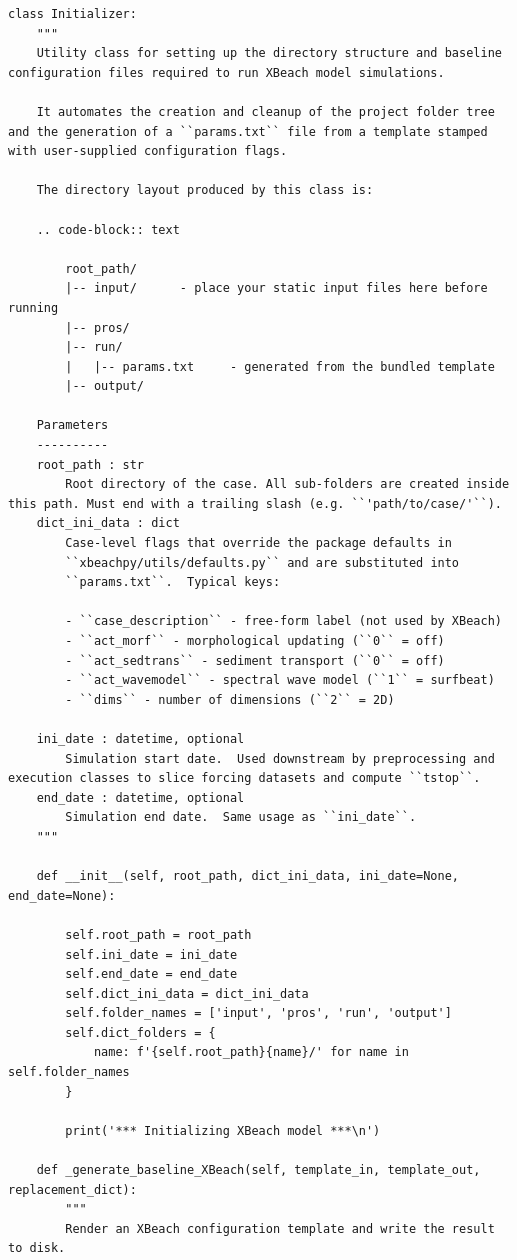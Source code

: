 \documentclass[preprint,12pt, a4paper]{elsarticle}
\begin{document}
\begin{lstlisting}
class Initializer:
    """
    Utility class for setting up the directory structure and baseline configuration files required to run XBeach model simulations.

    It automates the creation and cleanup of the project folder tree and the generation of a ``params.txt`` file from a template stamped with user-supplied configuration flags.

    The directory layout produced by this class is:

    .. code-block:: text

        root_path/
        |-- input/      - place your static input files here before running
        |-- pros/
        |-- run/
        |   |-- params.txt     - generated from the bundled template
        |-- output/

    Parameters
    ----------
    root_path : str
        Root directory of the case. All sub-folders are created inside this path. Must end with a trailing slash (e.g. ``'path/to/case/'``).
    dict_ini_data : dict
        Case-level flags that override the package defaults in
        ``xbeachpy/utils/defaults.py`` and are substituted into
        ``params.txt``.  Typical keys:

        - ``case_description`` - free-form label (not used by XBeach)
        - ``act_morf`` - morphological updating (``0`` = off)
        - ``act_sedtrans`` - sediment transport (``0`` = off)
        - ``act_wavemodel`` - spectral wave model (``1`` = surfbeat)
        - ``dims`` - number of dimensions (``2`` = 2D)

    ini_date : datetime, optional
        Simulation start date.  Used downstream by preprocessing and execution classes to slice forcing datasets and compute ``tstop``.
    end_date : datetime, optional
        Simulation end date.  Same usage as ``ini_date``.
    """

    def __init__(self, root_path, dict_ini_data, ini_date=None, end_date=None):

        self.root_path = root_path
        self.ini_date = ini_date
        self.end_date = end_date
        self.dict_ini_data = dict_ini_data
        self.folder_names = ['input', 'pros', 'run', 'output']
        self.dict_folders = {
            name: f'{self.root_path}{name}/' for name in self.folder_names
        }

        print('*** Initializing XBeach model ***\n')

    def _generate_baseline_XBeach(self, template_in, template_out, replacement_dict):
        """
        Render an XBeach configuration template and write the result to disk.


\end{lstlisting}
\end{document}
